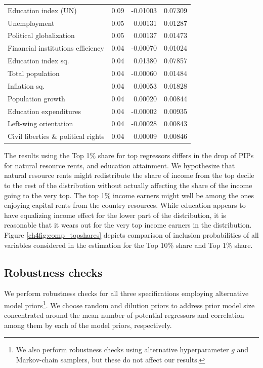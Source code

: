 \begin{refsection}
\begin{table}[ht!]
\begin{tabular}{lrrr}
  Education index (UN) & 0.09 & -0.01003 & 0.07309 \\ 
  Unemployment & 0.05 & 0.00131 & 0.01287 \\ 
  Political globalization & 0.05 & 0.00137 & 0.01473 \\ 
  Financial institutions efficiency & 0.04 & -0.00070 & 0.01024 \\ 
  Education index sq. & 0.04 & 0.01380 & 0.07857 \\ 
  Total population & 0.04 & -0.00060 & 0.01484 \\ 
  Inflation sq. & 0.04 & 0.00053 & 0.01828 \\ 
  Population growth & 0.04 & 0.00020 & 0.00844 \\
  Education expenditures & 0.04 & -0.00002 & 0.00935 \\ 
  Left-wing orientation & 0.04 & -0.00028 & 0.00843 \\ 
  Civil liberties \& political rights & 0.04 & 0.00009 & 0.00846 \\
    \bottomrule
  \end{tabular}
\end{table}

The results using the Top 1\% share for top regressors differs in the drop of \acp{PIP} for natural resource rents, and education attainment. We hypothesize that natural resource rents might redistribute the share of income from the top decile to the rest of the distribution without actually affecting the share of the income going to the very top. The top 1\% income earners might well be among the ones enjoying capital rents from the country resources. While education appears to have equalizing income effect for the lower part of the distribution, it is reasonable that it wears out for the very top income earners in the distribution. Figure \ref{ch4fig:comp_topshares} depicts comparison of inclusion probabilities of all variables considered in the estimation for the Top 10\% share and Top 1\% share.

\subsection{Robustness checks}
We perform robustness checks for all three specifications employing alternative model priors\footnote{We also perform robustness checks using alternative hyperparameter $g$ and Markov-chain samplers, but these do not affect our results.}. We choose random and dilution priors to address prior model size concentrated around the mean number of potential regressors and correlation among them by each of the model priors, respectively.


\end{refsection}
